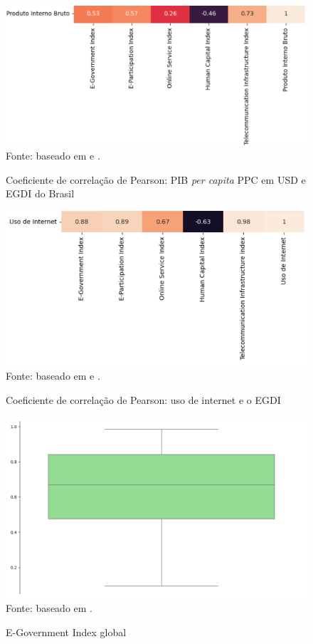 \begin{figure}[H]
    \centering
    \caption{Coeficiente de correlação de Pearson: PIB \textit{per capita} PPC em USD e EGDI do Brasil}
    \includegraphics[width=1\linewidth]{figuras/egdi/correlacao6.png}
    \label{fig:correlacao6}
    \footnotesize{Fonte: baseado em \cite{ONU_edgi_mapa} e \cite{WB_pib_per_capita_paises}.}
\end{figure}

\begin{figure}[H]
    \centering
    \caption{Coeficiente de correlação de Pearson: uso de internet e o EGDI}
    \includegraphics[width=1\linewidth]{figuras/egdi/correlacao7.png}
    \label{fig:correlacao7}
    \footnotesize{Fonte: baseado em \cite{ONU_edgi_mapa} e \cite{ITU_uso_internet_mundo}.}
\end{figure}

\begin{figure}[H]
    \centering
    \caption{E-Government Index global}
    \includegraphics[width=1\linewidth]{figuras/egdi/boxplot_egov_global.png}
    \label{fig:boxplot_egov_global}
    \footnotesize{Fonte: baseado em \cite{ONU_edgi_mapa}.}
\end{figure}

